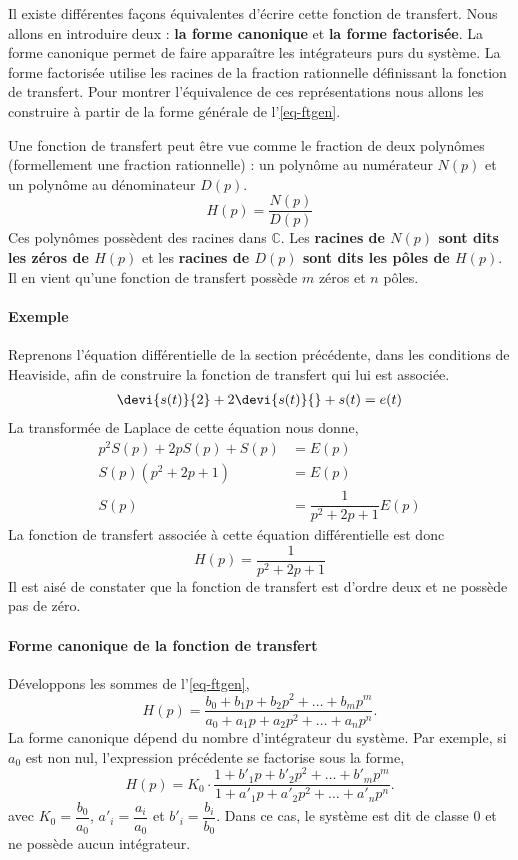 Il existe différentes façons équivalentes d'écrire cette fonction de transfert.
Nous allons en introduire deux :
\textbf{la forme canonique} et \textbf{la forme factorisée}. La forme canonique 
permet de faire apparaître les intégrateurs purs du système. La forme factorisée 
utilise les racines de la fraction rationnelle définissant la 
fonction de transfert. Pour montrer l'équivalence de ces représentations 
nous allons les construire à partir de la forme générale de l'\cref{eq-ftgen}.

Une fonction de transfert peut être vue comme le fraction de deux polynômes 
(formellement une fraction rationnelle) : un polynôme au numérateur $N(p)$ 
et un polynôme au dénominateur $D(p)$.
$$
H(p)=\dfrac{N(p)}{D(p)}
$$
Ces polynômes possèdent des racines dans $\mathbb{C}$. Les 
\textbf{racines de $N(p)$ sont dits les zéros de $H(p)$} et 
les \textbf{racines de $D(p)$ sont dits les pôles de $H(p)$}.
Il en vient qu'une fonction de transfert possède $m$ zéros et $n$ pôles.

\paragraph{Exemple}
Reprenons l'équation différentielle de la section précédente, dans 
les conditions de Heaviside, afin de construire la fonction de 
transfert qui lui est associée. 
\begin{align}
\devi{s(t)}{2}+2\devi{s(t)}{} + s(t) = e(t)
\end{align}
La transformée de Laplace de cette équation nous donne,
\begin{align*}
	p^2S(p)+2pS(p)+S(p)&=E(p)\\
	S(p)\left(p^2+2p+1\right)&=E(p)\\
	S(p)&=\dfrac{1}{p^2+2p+1}E(p)
\end{align*}
La fonction de transfert associée à cette équation différentielle est donc 
$$
H(p)=\dfrac{1}{p^2+2p+1}
$$
Il est aisé de constater que la fonction de transfert est d'ordre deux 
et ne possède pas de zéro.


\paragraph{Forme canonique de la fonction de transfert}
Développons les sommes de l'\cref{eq-ftgen},
$$
H(p)=\dfrac{b_0+b_1p+b_2p^2+\ldots+b_mp^m}{a_0+a_1p+a_2p^2+\ldots+a_np^n}.
$$
La forme canonique dépend du nombre d'intégrateur du système. 
Par exemple, si $a_0$ est non nul, l'expression précédente se factorise 
sous la forme,
$$
H(p)=K_0\cdot\dfrac{1+b'_1p+b'_2p^2+\ldots+b'_mp^m}
                   {1+a'_1p+a'_2p^2+\ldots+a'_np^n}.
$$
avec $K_0=\dfrac{b_0}{a_0}$, $a'_i=\dfrac{a_i}{a_0}$ et 
$b'_i=\dfrac{b_i}{b_0}$. Dans ce cas, le système est dit de 
classe 0 et ne possède aucun intégrateur.

